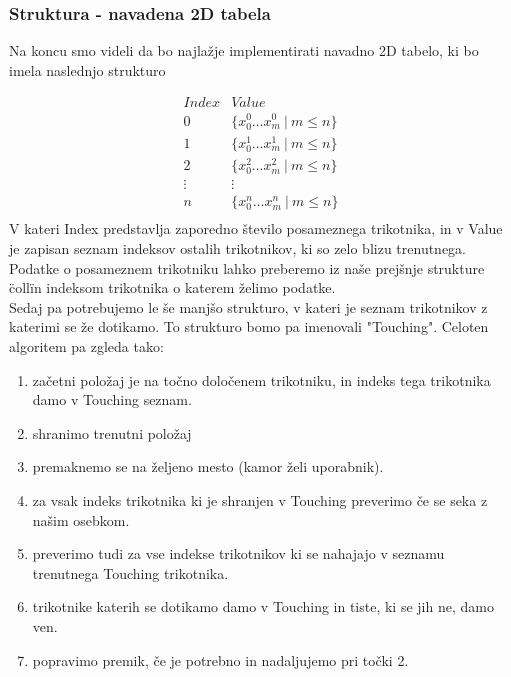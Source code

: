\documentclass[10pt,a4paper]{article}
\begin{document}
\subsubsection*{Struktura - navadena 2D tabela}
Na koncu smo videli da bo najlažje implementirati navadno 2D tabelo, ki bo imela naslednjo strukturo


\[
\begin{array}{l|l}
Index     & Value \\
0    & \lbrace x_0^0 \ldots x_m^0 \ | \ m\leq n  \rbrace \\
1    & \lbrace x_0^1 \ldots x_m^1 \ | \ m\leq n  \rbrace \\
2    & \lbrace x_0^2 \ldots x_m^2 \ | \ m\leq n  \rbrace \\
 \vdots   & \vdots \\
n    & \lbrace x_0^n \ldots x_m^n \ | \ m\leq n  \rbrace \\
\end{array}
\]
V kateri Index predstavlja zaporedno število posameznega trikotnika, in v Value je zapisan seznam indeksov ostalih trikotnikov, ki so zelo blizu trenutnega. Podatke o posameznem trikotniku lahko preberemo iz naše prejšnje strukture \"coll\" in indeksom trikotnika o katerem želimo podatke.\\

Sedaj pa potrebujemo le še manjšo strukturo, v kateri je seznam trikotnikov z katerimi se že dotikamo. To strukturo bomo pa imenovali "Touching". Celoten algoritem pa zgleda tako:
\begin{enumerate}
\item začetni položaj je na točno določenem trikotniku, in indeks tega trikotnika damo v Touching seznam.
\item shranimo trenutni položaj
\item premaknemo se na željeno mesto (kamor želi uporabnik).
\item za vsak indeks trikotnika ki je shranjen v Touching preverimo če se seka z našim osebkom.
\item preverimo tudi za vse indekse trikotnikov ki se nahajajo v seznamu trenutnega Touching trikotnika.
\item trikotnike katerih se dotikamo damo v Touching in tiste, ki se jih ne, damo ven. 
\item popravimo premik, če je potrebno in nadaljujemo pri točki 2.
\end{enumerate}
\end{document}
